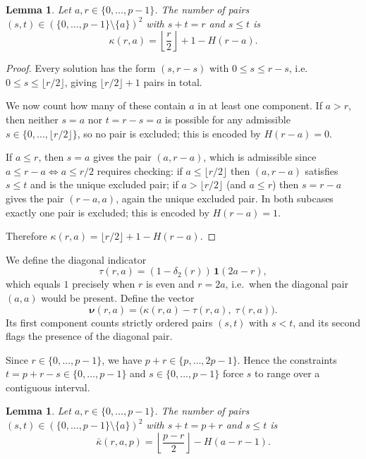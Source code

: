 \documentclass[12pt]{article}
\newtheorem{lemma}[theorem]{Lemma}
\begin{document}
\begin{lemma}\label{lem:conteo_excluyendo_a_general}
Let $a,r \in \{0,\dots,p-1\}$.
The number of pairs
$(s,t) \in (\{0,\dots,p-1\}\setminus\{a\})^2$
with $s+t=r$ and $s \le t$ is
\[
\kappa(r,a)
=
\left\lfloor\frac{r}{2}\right\rfloor+1-H(r-a).
\]
\end{lemma}

\begin{proof}
Every solution has the form $(s, r-s)$ with $0 \le s \le r-s$,
i.e.\ $0 \le s \le \lfloor r/2 \rfloor$, giving
$\lfloor r/2 \rfloor + 1$ pairs in total.

We now count how many of these contain $a$ in at least one component.
If $a > r$, then neither $s = a$ nor $t = r-s = a$ is possible for
any admissible $s \in \{0,\dots,\lfloor r/2\rfloor\}$, so no pair is
excluded; this is encoded by $H(r-a) = 0$.

If $a \le r$, then $s = a$ gives the pair $(a, r-a)$, which is
admissible since $a \le r-a \iff a \le r/2$ requires checking:
if $a \le \lfloor r/2 \rfloor$ then $(a,r-a)$ satisfies $s \le t$
and is the unique excluded pair;
if $a > \lfloor r/2 \rfloor$ (and $a \le r$) then $s = r-a$ gives
the pair $(r-a, a)$, again the unique excluded pair.
In both subcases exactly one pair is excluded; this is encoded by
$H(r-a) = 1$.

Therefore $\kappa(r,a) = \lfloor r/2 \rfloor + 1 - H(r-a)$.
\end{proof}

We define the diagonal indicator
\[
\tau(r,a)
=
(1-\delta_2(r))\,\mathbf{1}(2a-r),
\]
which equals $1$ precisely when $r$ is even and $r = 2a$,
i.e.\ when the diagonal pair $(a,a)$ would be present.
Define the vector
\[
\bm{\nu}(r,a)
=
\bigl(\kappa(r,a)-\tau(r,a),\;\tau(r,a)\bigr).
\]
Its first component counts strictly ordered pairs $(s,t)$ with
$s < t$, and its second flags the presence of the diagonal pair.

Since $r \in \{0,\dots,p-1\}$, we have $p+r \in \{p,\dots,2p-1\}$.
Hence the constraints $t=p+r-s \in \{0,\dots,p-1\}$ and $s \in \{0,\dots,p-1\}$
force $s$ to range over a contiguous interval.

\begin{lemma}\label{lem:conteo_p_r}
Let $a,r \in \{0,\dots,p-1\}$.
The number of pairs
$(s,t) \in (\{0,\dots,p-1\}\setminus\{a\})^2$
with $s+t=p+r$ and $s \le t$ is
\[
\bar{\kappa}(r,a,p)
=
\left\lfloor\frac{p-r}{2}\right\rfloor - H(a-r-1).
\]
\end{lemma}
\end{document}
